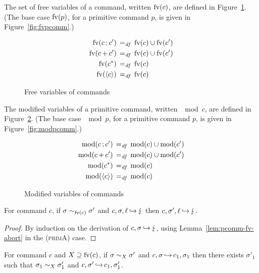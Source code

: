 \documentclass[11pt]{report}
\begin{document}
The set of free variables of a command, written $\mathrm{fv}(c)$, are defined in Figure~\ref{fig:fvcomm}. (The base case $\mathrm{fv}(p)$, for a primitive command $p$, is given in Figure~\ref{fig:fvpcomm}.)

\begin{figure}[h]
	\centering
	\begin{align*}
		\mathrm{fv}(c \operatorname{;} c') \operatorname{\;=_{\mathit{df}}\;} {} & \mathrm{fv}(c) \cup \mathrm{fv}(c') \\ 
		\mathrm{fv}(c \operatorname{+} c') \operatorname{\;=_{\mathit{df}}\;} {} & \mathrm{fv}(c) \cup \mathrm{fv}(c') \\ 
		\mathrm{fv}(c^{\operatorname{\ast}}) \operatorname{\;=_{\mathit{df}}\;} {} & \mathrm{fv}(c) \\ 
		\mathrm{fv}(\left\langle c \right\rangle) \operatorname{\;=_{\mathit{df}}\;} {} & \mathrm{fv}(c) 
 	\end{align*}
	\caption{Free variables of commands}
	\label{fig:fvcomm}
\end{figure}


The modified variables of a primitive command, written $\mod{c}$, are defined in Figure~\ref{fig:modcomm}. (The base case $\mod{p}$, for a primitive command $p$, is given in Figure~\ref{fig:modpcomm}.)

\begin{figure}[h]
	\centering
	\begin{align*}
		\mathrm{mod}(c \operatorname{;} c') \operatorname{\;=_{\mathit{df}}\;} {} & \mathrm{mod}(c) \cup \mathrm{mod}(c') \\ 
		\mathrm{mod}(c \operatorname{+} c') \operatorname{\;=_{\mathit{df}}\;} {} & \mathrm{mod}(c) \cup \mathrm{mod}(c') \\ 
		\mathrm{mod}(c^{\operatorname{\ast}}) \operatorname{\;=_{\mathit{df}}\;} {} & \mathrm{mod}(c) \\ 
		\mathrm{mod}(\left\langle c \right\rangle) \operatorname{\;=_{\mathit{df}}\;} {} & \mathrm{mod}(c) 
 	\end{align*}
	\caption{Modified variables of commands}
	\label{fig:modcomm}
\end{figure}



\begin{lemma}
	\label{lem:comm-fv-abort}
	For command $c$, if $\sigma \sim_{\mathrm{fv}(c)} \sigma'$ and $c,\sigma,\ell \operatorname{\hookrightarrow} \lightning$ then $c,\sigma',\ell \operatorname{\hookrightarrow} \lightning$. 
\end{lemma}

\begin{proof}
	By induction on the derivation of $c,\sigma \operatorname{\hookrightarrow} \lightning$, using Lemma~\ref{lem:pcomm-fv-abort} in the \textsc{(primA)} case. 
\end{proof}

\begin{lemma}\label{lem:comm-fv-step}
	For command $c$ and $X \supseteq \mathrm{fv}(c)$, if $\sigma \sim_{X} \sigma'$ and $c,\sigma \operatorname{\hookrightarrow} c_1,\sigma_1$ then there exists $\sigma'_1$  such that $\sigma_1 \sim_{X} \sigma_1'$ and $c,\sigma' \operatorname{\hookrightarrow} c_1,\sigma'_1$.
\end{lemma}
\end{document}
